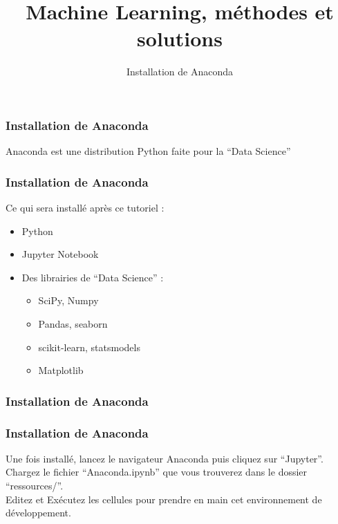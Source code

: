 \documentclass{formation}
\title{Machine Learning, méthodes et solutions}
\subtitle{Installation de Anaconda}
\begin{document}
\maketitle

\begin{frame}
  \frametitle{Installation de Anaconda}
  Anaconda est une distribution Python faite pour la ``Data Science'' \\
\end{frame}

\begin{frame}
  \frametitle{Installation de Anaconda}
  Ce qui sera installé après ce tutoriel :
  \begin{itemize}
  \item Python
  \item Jupyter Notebook
  \item Des librairies de ``Data Science'' :
    \begin{itemize}
    \item SciPy, Numpy
    \item Pandas, seaborn
    \item scikit-learn, statsmodels
    \item Matplotlib
    \end{itemize}
  \end{itemize}
\end{frame}

\begin{frame}
  \frametitle{Installation de Anaconda}
\end{frame}

\begin{frame}
  \frametitle{Installation de Anaconda}
  Une fois installé, lancez le navigateur Anaconda puis cliquez sur ``Jupyter''. \\
  Chargez le fichier ``Anaconda.ipynb'' que vous trouverez dans le dossier ``ressources/''. \\
  Editez et Exécutez les cellules pour prendre en main cet environnement de développement.
\end{frame}
\end{document}
